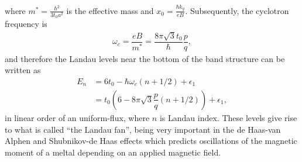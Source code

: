 \documentclass{report}
\newcommand{\f}[2]{\dfrac{#1}{#2}}
\begin{document}
where $m^{*} = \frac{\hbar^{2}}{3t_{0}a^{2}}$ is the effective mass and $x_{0} = \frac{\hbar k_{y}}{eB}$. Subsequently, the cyclotron frequency is
\begin{gather}
	\omega_{c} = \f{eB}{m^{*}} = \f{8 \pi \sqrt{3} t_{0}}{\hbar}  \f{p}{q},
\end{gather}
and therefore the Landau levels near the bottom of the band structure can be written as
\begin{equation}
	\begin{aligned}
		E_{n}
		 & = 6 t_{0} - \hbar \omega_{c} (n + 1 /2) + \epsilon_{1}                    \\
		 & = t_{0} \left(6 - 8\pi\sqrt{3} \f{p}{q}( n + 1 /2)\right) + \epsilon_{1},
	\end{aligned}
\end{equation}
in linear order of an uniform-flux, where $n$ is Landau index. These levels give rise to what is called ``the Landau fan'', being very important in the de Haas-van Alphen and Shubnikov-de Haas effects \cite{10.1119/1.1615568} which predicts oscillations of the magnetic moment of a meltal depending on an applied magnetic field.
\end{document}

